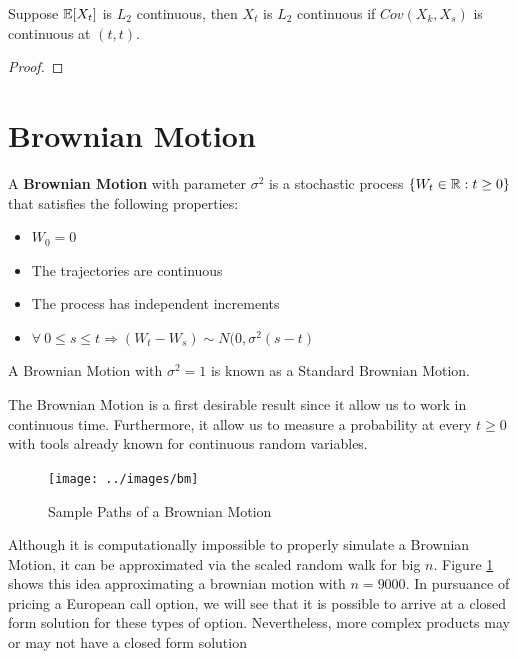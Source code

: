\documentclass[../TGMAFFIRO]{subfiles}
\begin{document}
\begin{theorem}
	Suppose $\mathbb{E}[X_t]$ is $L_2$ continuous, then $X_t$ is $L_2$ continuous if $Cov(X_k, X_s)$ is continuous at $(t,t)$.
\end{theorem}

\begin{proof}
	
\end{proof}

\section{Brownian Motion}
\begin{definition}\label{def:brownian_motion}
	A \textbf{Brownian Motion} with parameter $\sigma^2$ is a stochastic process $\{W_t \in \mathbb{R}:t\geq 0\}$ that satisfies the following properties:
	\begin{itemize}
		\item $W_0 = 0$
		\item The trajectories are continuous
		\item The process has independent increments
		\item $\forall \ 0 \leq s \leq t \Longrightarrow (W_t - W_s) \sim N(0, \sigma^2(s - t)$
	\end{itemize}
\end{definition}

\begin{remark}
	A Brownian Motion with $\sigma^2 = 1$ is known as a Standard Brownian Motion.
\end{remark}

The Brownian Motion is a first desirable result since it allow us to work in continuous time. Furthermore, it allow us to measure a probability at every $t\geq 0$ with tools already known for continuous random variables. 

\begin{figure}[h]
	\centering
	\label{fig:Brownian_Motion}
	\texttt{[image: ../images/bm]}
	\caption{Sample Paths of a Brownian Motion}
\end{figure}

Although it is computationally impossible to properly simulate a Brownian Motion, it can be approximated via the scaled random walk for big $n$. Figure \ref{fig:Brownian_Motion} shows this idea approximating a brownian motion with $n=9000$. In pursuance of pricing a European call option, we will see that it is possible to arrive at a closed form solution for these types of option. Nevertheless, more complex products may or may not have a closed form solution\\
\end{document}
